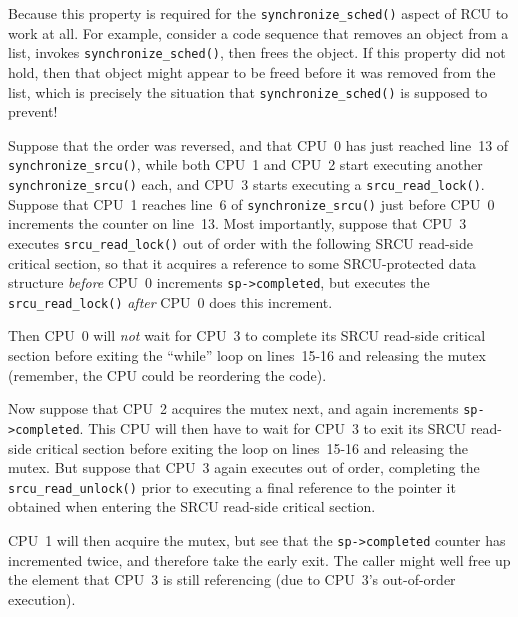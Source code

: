 	Because this property is required for the {\tt synchronize\_sched()}
	aspect of RCU to work at all.
	For example, consider a code sequence that removes an object
	from a list, invokes {\tt synchronize\_sched()}, then frees
	the object.
	If this property did not hold, then that object might appear
	to be freed before it was
	removed from the list, which is precisely the situation that
	{\tt synchronize\_sched()} is supposed to prevent!


	Suppose that the order was reversed, and that CPU~0
	has just reached line~13 of
	{\tt synchronize\_srcu()}, while both CPU~1 and CPU~2 start executing
	another {\tt synchronize\_srcu()} each, and CPU~3 starts executing a
	{\tt srcu\_read\_lock()}.
	Suppose that CPU~1 reaches line~6 of {\tt synchronize\_srcu()}
	just before CPU~0 increments the counter on line~13.
	Most importantly, suppose that
	CPU~3 executes {\tt srcu\_read\_lock()}
	out of order with the following SRCU read-side critical section,
	so that it acquires a reference to some SRCU-protected data
	structure \emph{before} CPU~0 increments {\tt sp->completed}, but
	executes the {\tt srcu\_read\_lock()} \emph{after} CPU~0 does
	this increment.
	
	Then CPU~0 will \emph{not} wait for CPU~3 to complete its
	SRCU read-side critical section before exiting the ``while''
	loop on lines~15-16 and releasing the mutex (remember, the
	CPU could be reordering the code).
	
	Now suppose that CPU~2 acquires the mutex next,
	and again increments {\tt sp->completed}.
	This CPU will then have to wait for CPU~3 to exit its SRCU
	read-side critical section before exiting the loop on
	lines~15-16 and releasing the mutex.
	But suppose that CPU~3 again executes out of order,
	completing the {\tt srcu\_read\_unlock()} prior to
	executing a final reference to the pointer it obtained
	when entering the SRCU read-side critical section.

	CPU~1 will then acquire the mutex, but see that the
	{\tt sp->completed} counter has incremented twice, and
	therefore take the early exit.
	The caller might well free up the element that CPU~3 is
	still referencing (due to CPU~3's out-of-order execution).

